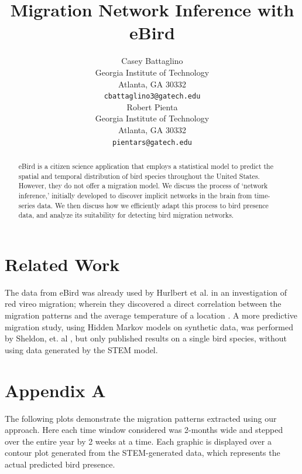 \documentclass{article} %
\title{Migration Network Inference with eBird}
\author{
Casey Battaglino \\
Georgia Institute of Technology\\
Atlanta, GA 30332 \\
\texttt{cbattaglino3@gatech.edu} \\
\And
Robert Pienta \\
Georgia Institute of Technology \\
Atlanta, GA 30332 \\
\texttt{pientars@gatech.edu} \\
}
\begin{document}
\maketitle

\begin{abstract}
eBird is a citizen science application that employs a statistical model to predict the spatial and temporal distribution of bird species throughout the United States. However, they do not offer a migration model. We discuss the process of `network inference,' initially developed to discover implicit networks in the brain from time-series data. We then discuss how we efficiently adapt this process to bird presence data, and analyze its suitability for detecting bird migration networks. 
\end{abstract}













\section{Related Work}
The data from eBird was already used by Hurlbert et al. in an investigation of red vireo migration; wherein they discovered a direct correlation between the migration patterns and the average temperature of a location \cite{hurlbert}. A more predictive migration study, using Hidden Markov models on synthetic data, was performed by Sheldon, et. al \cite{conf/nips/SheldonEK07}, but only published results on a single bird species, without using data generated by the STEM model. 

\appendix
\section{Appendix A}\label{appendicks}
The following plots demonstrate the migration patterns extracted using our approach.
Here each time window considered was 2-months wide and stepped over the entire year by 2 weeks at a time.
Each graphic is displayed over a contour plot generated from the STEM-generated data, which represents the actual predicted bird presence.
\end{document}
